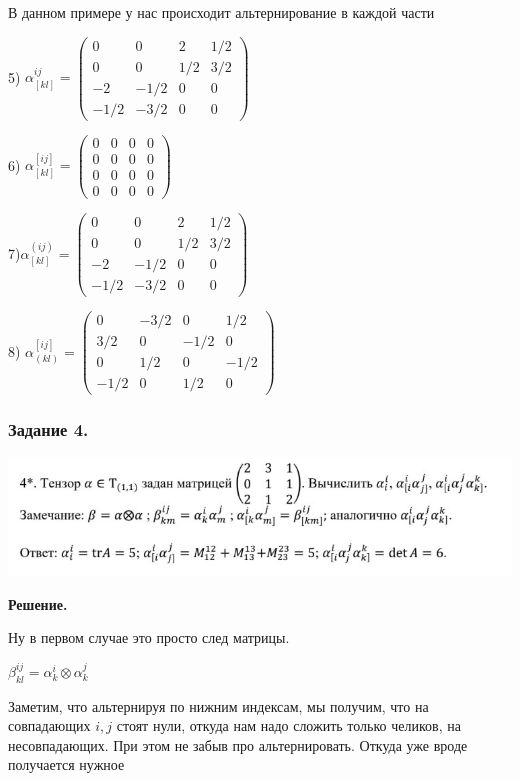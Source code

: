 В данном примере у нас происходит альтернирование в каждой части

5) $\alpha^{ij}_{[kl]} = \begin{pmatrix}
    0 & 0 & 2 & 1/2\\
    0 & 0 &1/2 & 3/2 \\
    -2 & -1/2 & 0 & 0 \\
    -1/2 & -3/2 & 0 & 0
\end{pmatrix}$

6) $\alpha^{[ij]}_{[kl]} = \begin{pmatrix}
    0 & 0 & 0 & 0\\
    0 & 0 &0 & 0 \\
    0 & 0 & 0 & 0 \\
    0 & 0 & 0 & 0
\end{pmatrix}$

7)$\alpha^{(ij)}_{[kl]} = \begin{pmatrix}
    0 & 0 & 2 & 1/2\\
    0 & 0 &1/2 & 3/2 \\
    -2 & -1/2 & 0 & 0 \\
    -1/2 & -3/2 & 0 & 0
\end{pmatrix}$

8) $\alpha^{[ij]}_{(kl)} = \begin{pmatrix}
    0 & -3/2 & 0 & 1/2 \\
    3/2 & 0 & -1/2 & 0 \\
    0 & 1/2 & 0 & -1/2\\
    -1/2 & 0 & 1/2 & 0
\end{pmatrix}$

\subsubsection{Задание 4.}

\begin{center}
   \includegraphics[width = 14cm]{assets/homework-3-task-4.jpg}
\end{center}

\textbf{Решение.}

Ну в первом случае это просто след матрицы.

$\beta^{ij}_{kl} = \alpha^{i}_{k}\otimes \alpha^{j}_k$

Заметим, что альтернируя по нижним индексам, мы получим, что на совпадающих $i,j$ стоят нули, откуда нам надо сложить только челиков, на несовпадающих. При этом не забыв про альтернировать. Откуда уже вроде получается нужное

